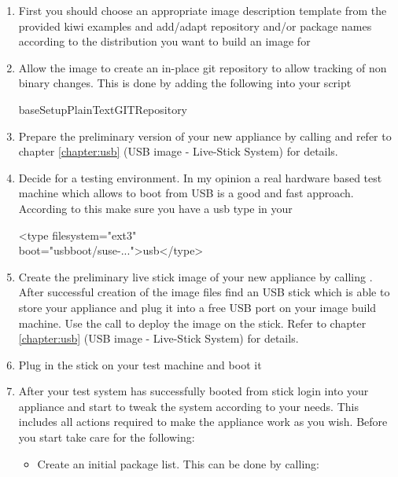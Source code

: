\begin{enumerate}
\item First you should choose an appropriate image description template from
      the provided kiwi examples and add/adapt repository and/or
      package names according to the distribution you want to
      build an image for
\item Allow the image to create an in-place git repository to
      allow tracking of non binary changes. This is done by adding
      the following into your  script
 
      \begin{Command}{8cm}
      baseSetupPlainTextGITRepository
      \end{Command}

\item Prepare the preliminary version of your new appliance by
      calling  and refer to chapter \ref{chapter:usb}
      (USB image - Live-Stick System) for details.
\item Decide for a testing environment. In my opinion a real
      hardware based test machine which allows to boot from USB
      is a good and fast approach. According to this make sure
      you have a usb type in your 

      \begin{Command}{12cm}
      <type filesystem="ext3"\\
      \hspace*{1.6cm}boot="usbboot/suse-...">usb</type>
      \end{Command}

\item Create the preliminary live stick image of your new appliance
      by calling . After successful creation
      of the image files find an USB stick which is able to store
      your appliance and plug it into a free USB port on your image
      build machine. Use the  call to deploy
      the image on the stick. Refer to chapter \ref{chapter:usb}
      (USB image - Live-Stick System) for details.
\item Plug in the stick on your test machine and boot it
\item After your test system has successfully booted from stick login
      into your appliance and start to tweak the system according to
      your needs. This includes all actions required to make the
      appliance work as you wish. Before you start take care for
      the following:
      \begin{itemize}
      \item Create an initial package list. This can be done by calling:


\end{itemize}
\end{enumerate}
